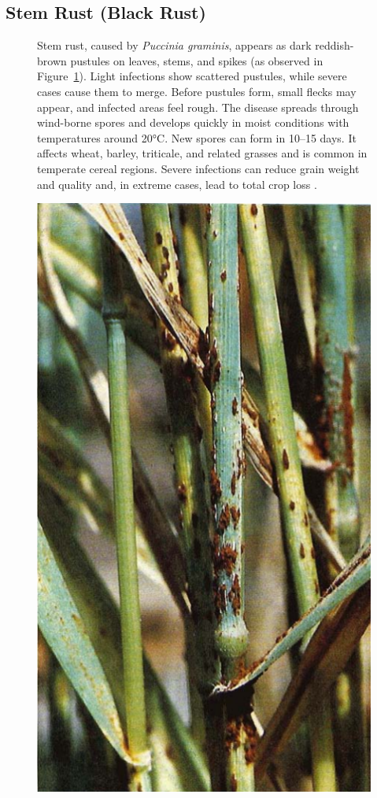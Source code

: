 \subsection{Stem Rust (Black Rust)}

\begin{figure}[H]
    \centering
    \begin{minipage}{0.65\textwidth}
        
        Stem rust, caused by \textit{Puccinia graminis}, appears as dark reddish-brown pustules on leaves, stems, and spikes (as observed in Figure~\ref{fig:Figure04}). Light infections show scattered pustules, while severe cases cause them to merge. Before pustules form, small flecks may appear, and infected areas feel rough. The disease spreads through wind-borne spores and develops quickly in moist conditions with temperatures around 20°C. New spores can form in 10–15 days. It affects wheat, barley, triticale, and related grasses and is common in temperate cereal regions. Severe infections can reduce grain weight and quality and, in extreme cases, lead to total crop loss \parencite{duveiller2012wheat}.
    \end{minipage}%
    \hfill
    \begin{minipage}{0.3\textwidth}
        \centering
        \includegraphics[width=0.6\linewidth]{chapters/chapter2/images/Figure04.png}
        \label{fig:Figure04}
    \end{minipage}
\end{figure}


